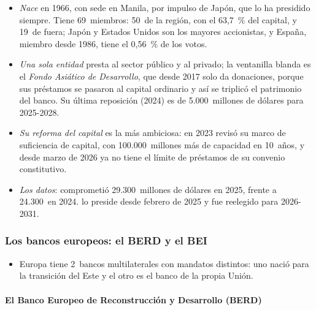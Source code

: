 \documentclass[11pt]{article}
\begin{document}
\begin{itemize}
\item \emph{Nace} en 1966, con sede en Manila, por impulso de Japón, que lo ha presidido siempre. Tiene 69~miembros: 50~de la región, con el 63,7~\% del capital, y 19~de fuera; Japón y Estados Unidos son los mayores accionistas, y España, miembro desde 1986, tiene el 0,56~\% de los votos\nocite{BAsD2026Estados}.
\item \emph{Una sola entidad} presta al sector público y al privado; la ventanilla blanda es el \emph{Fondo Asiático de Desarrollo}, que desde 2017 solo da donaciones, porque sus préstamos se pasaron al capital ordinario y así se triplicó el patrimonio del banco. Su última reposición (2024) es de 5.000~millones de dólares para 2025-2028.
\item \emph{Su reforma del capital} es la más ambiciosa: en 2023 revisó su marco de suficiencia de capital, con 100.000~millones más de capacidad en 10~años, y desde marzo de 2026 ya no tiene el límite de préstamos de su convenio constitutivo.
\item \emph{Los datos}: comprometió 29.300~millones de dólares en 2025, frente a 24.300~en 2024\nocite{BAsD2026Estados}.  lo preside desde febrero de 2025 y fue reelegido para 2026-2031.
\end{itemize}

\subsubsection{Los bancos europeos: el BERD y el BEI}\label{sec:europeos}

\begin{itemize}
\item Europa tiene 2~bancos multilaterales con mandatos distintos: uno nació para la transición del Este y el otro es el banco de la propia Unión.
\end{itemize}

\paragraph{El Banco Europeo de Reconstrucción y Desarrollo (BERD)}\label{sec:berd}
\end{document}
